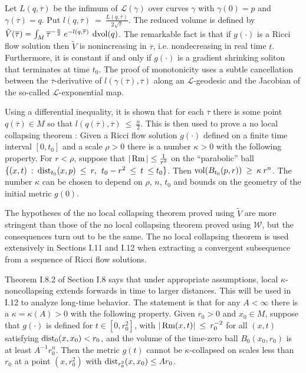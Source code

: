 Let $L(q, \overline{\tau})$
be the infimum of ${\mathcal L}(\gamma)$ over curves $\gamma$ with
$\gamma(0) = p$ and
$\gamma(\overline{\tau}) = q$. Put $l(q, \overline{\tau}) \: = \:
\frac{L(q, \overline{\tau})}{2\sqrt{\overline{\tau}}}$. The reduced volume
is defined by $\tilde{V}(\overline{\tau}) =
\int_M \overline{\tau}^{- \frac{n}{2}} \: e^{-l(q, \overline{\tau})} \:
\operatorname{dvol}(q)$. The remarkable fact is that if $g(\cdot)$ is a Ricci flow
solution then $\tilde{V}$ is nonincreasing in $\overline{\tau}$, i.e.
nondecreasing in real time $t$. Furthermore, it is constant if and only if
$g(\cdot)$ is a gradient shrinking soliton that terminates at time
$t_0$. The proof of monotonicity uses a subtle cancellation between
the $\overline{\tau}$-derivative of $l(\gamma(\overline{\tau}), \overline{\tau})$
along an ${\mathcal L}$-geodesic and the Jacobian of the
so-called ${\mathcal L}$-exponential map.

Using a differential inequality, it is shown that for each $\overline{\tau}$ there
is some point $q(\overline{\tau}) \in M$ so that
$l(q(\overline{\tau}), \overline{\tau}) \: \le \: \frac{n}{2}$. This is then
used to prove a no local collapsing theorem :  Given a Ricci flow
solution $g(\cdot)$
defined on a finite time interval $[0, t_0]$
and a scale $\rho > 0$ there
is a number $\kappa > 0$
with the following property. For $r < \rho$, suppose that
$|\operatorname{Rm}| \le \frac{1}{r^2}$ on the
``parabolic'' ball $\{(x,t) \: : \: \operatorname{dist}_{t_0}(x, p) \: \le \: r, \: \:
t_0 - r^2 \: \le \: t \: \le t_0\}$. Then
$\operatorname{vol}(B_{t_0}(p, r)) \: \ge \: \kappa \: r^n$. The number $\kappa$ can be chosen
to depend on $\rho$, $n$, $t_0$ and bounds on the geometry of the initial metric
$g(0)$.

The hypotheses of the no local collapsing theorem proved using $\tilde{V}$ are
more stringent than those of the no local collapsing theorem proved using $\mathcal{W}$,
but the consequences turn out to be the same.  The no local collapsing theorem is
used extensively in Sections I.11 and I.12 when extracting a convergent
subsequence from a sequence of Ricci flow solutions.

Theorem I.8.2 of Section I.8 says that under appropriate
assumptions, local $\kappa$-noncollapsing extends forwards in
time to larger distances.
This will be used in I.12 to analyze long-time behavior.
The statement is that for any $A < \infty$ there is a
$\kappa = \kappa(A) > 0$ with the following property. Given $r_0 > 0$ and
$x_0 \in M$, suppose that
$g(\cdot)$ is defined for $t \in [0, r_0^2]$, with
$|\operatorname{Rm}(x,t)| \: \le \: r_0^{-2}$ for all $(x,t)$ satisfying
$\operatorname{dist}_0(x, x_0) < r_0$, and the volume of the time-zero ball
$B_0(x_0, r_0)$ is at least $A^{-1} r_0^n$. Then the metric
$g(t)$ cannot be $\kappa$-collapsed on scales less than $r_0$
at a point $(x, r_0^2)$ with  $\operatorname{dist}_{r_0^2}(x, x_0) \le Ar_0$.

